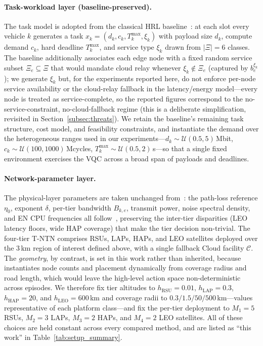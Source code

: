 \documentclass[11pt,a4paper]{article}
\theoremstyle{definition}
\begin{document}
\paragraph{Task-workload layer (baseline-preserved).}
The task model is adopted from the classical HRL baseline~\cite{hrl_ntn}: at each slot every vehicle $k$ generates a task $x_k=(d_k,c_k,T_k^{\max},\xi_k)$ with payload size $d_k$, compute demand $c_k$, hard deadline $T_k^{\max}$, and service type $\xi_k$ drawn from $|\Xi|{=}6$ classes. The baseline additionally associates each edge node with a fixed random service subset $\Xi_e\subseteq\Xi$ that would mandate cloud relay whenever $\xi_k\notin\Xi_e$ (captured by $b_e^{\xi_k}$); we generate $\xi_k$ but, for the experiments reported here, do not enforce per-node service availability or the cloud-relay fallback in the latency/energy model---every node is treated as service-complete, so the reported figures correspond to the no-service-constraint, no-cloud-fallback regime (this is a deliberate simplification, revisited in Section~\ref{subsec:threats}). We retain the baseline's remaining task structure, cost model, and feasibility constraints, and instantiate the demand over the heterogeneous ranges used in our experiments---$d_k\!\sim\!\mathcal{U}(0.5,5)\,$Mbit, $c_k\!\sim\!\mathcal{U}(100,1000)\,$Mcycles, $T_k^{\max}\!\sim\!\mathcal{U}(0.5,2)\,$s---so that a single fixed environment exercises the VQC across a broad span of payloads and deadlines.

\paragraph{Network-parameter layer.}
The physical-layer parameters are taken unchanged from~\cite{hrl_ntn}: the path-loss reference $\eta_0$, exponent $\delta$, per-tier bandwidth $B_{k,e}$, transmit power, noise spectral density, and EN CPU frequencies all follow~\cite[Table~3]{hrl_ntn}, preserving the inter-tier disparities (LEO latency floors, wide HAP coverage) that make the tier decision non-trivial. The four-tier T-NTN comprises RSUs, LAPs, HAPs, and LEO satellites deployed over the $3$\,km region of interest defined above, with a single fallback Cloud facility $\mathcal{C}$. The \emph{geometry}, by contrast, is set in this work rather than inherited, because~\cite{hrl_ntn} instantiates node counts and placement dynamically from coverage radius and road length, which would leave the high-level action space non-deterministic across episodes. We therefore fix tier altitudes to $h_{\mathrm{RSU}}{=}0.01$, $h_{\mathrm{LAP}}{=}0.3$, $h_{\mathrm{HAP}}{=}20$, and $h_{\mathrm{LEO}}{=}600$\,km and coverage radii to $0.3/1.5/50/500$\,km---values representative of each platform class---and fix the per-tier deployment to $M_1{=}5$ RSUs, $M_2{=}3$ LAPs, $M_3{=}2$ HAPs, and $M_4{=}2$ LEO satellites. All of these choices are held constant across every compared method, and are listed as ``this work'' in Table~\ref{tab:setup_summary}.
\end{document}
